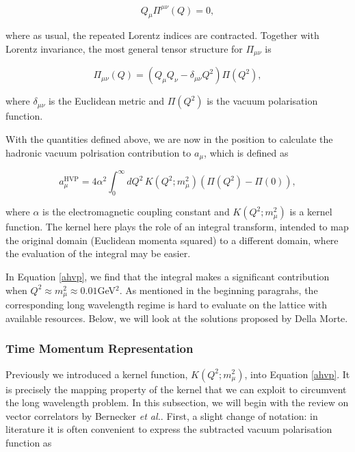 \documentclass{article}
\numberwithin{equation}{section} %
\begin{document}
\begin{equation}
Q_\mu\Pi^{\mu\nu}(Q)=0,
\end{equation}

\noindent where as usual, the repeated Lorentz indices are contracted. Together with Lorentz invariance, the most general tensor structure for $\Pi_{\mu\nu}$ is

\begin{equation}
\Pi_{\mu\nu}(Q) =\left(Q_\mu Q_\nu - \delta_{\mu\nu}Q^2 \right)\Pi(Q^2),
\label{tensor structure}
\end{equation}

\noindent where $\delta_{\mu\nu}$ is the Euclidean metric and $\Pi(Q^2)$ is the vacuum polarisation function.

With the quantities defined above, we are now in the position to calculate the hadronic vacuum polrisation contribution to $a_\mu$, which is defined as 

\begin{equation}
a_\mu^\mathrm{HVP} = 4\alpha^2 \int_0^\infty dQ^2 \, K(Q^2;m_\mu^2) \left(\Pi(Q^2) - \Pi(0) \right),
\label{ahvp}
\end{equation}

\noindent where $\alpha$ is the electromagnetic coupling constant and $K(Q^2;m_\mu^2)$ is a kernel function. The kernel here plays the role of an integral transform, intended to map the original domain (Euclidean momenta squared) to a different domain, where the evaluation of the integral may be easier. 

In Equation \ref{ahvp}, we find that the integral makes a significant contribution when $Q^2\approx m_\mu^2\approx 0.01$GeV$^2$. As mentioned in the beginning paragrahs, the corresponding long wavelength regime is hard to evaluate on the lattice with available resources. Below, we will look at the solutions proposed by Della Morte\cite{dellamorte}.

\subsubsection{Time Momentum Representation}\label{tmr}

Previously we introduced a kernel function, $K(Q^2;m_\mu^2)$, into Equation \ref{ahvp}. It is precisely the mapping property of the kernel that we can exploit to circumvent the long wavelength problem. In this subsection, we will begin with the review on vector correlators by Bernecker \textit{et al.}\cite{vector}. First, a slight change of notation: in literature it is often convenient to express the subtracted vacuum polarisation function as
\end{document}
